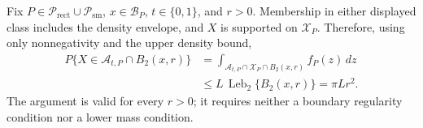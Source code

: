 Fix \(P\in\mathcal P_{\mathrm{rect}}\cup\mathcal P_{\mathrm{sm}}\), \(x\in\mathcal B_P\), \(t\in\{0,1\}\), and \(r>0\).  Membership in either displayed class includes the density envelope, and \(X\) is supported on \(\mathcal X_P\).  Therefore, using only nonnegativity and the upper density bound,
\[
\begin{aligned}
 P\{X\in\mathcal A_{t,P}\cap B_2(x,r)\}
 &=\int_{\mathcal A_{t,P}\cap\mathcal X_P\cap B_2(x,r)}f_P(z)\,dz\\
 &\leq L\,\operatorname{Leb}_2\{B_2(x,r)\}
 =\pi Lr^2.
\end{aligned}
\]
The argument is valid for every \(r>0\); it requires neither a boundary regularity condition nor a lower mass condition.
